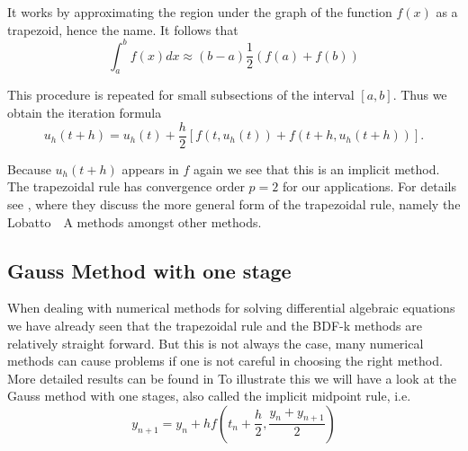 	It works by approximating the region under the graph of the function $f(x)$ as a trapezoid, hence the name. It follows that	
	\begin{displaymath}
		\int_{a}^{b} f(x) dx \approx (b-a)\frac{1}{2} (f(a)+f(b))
	\end{displaymath}
	
	This procedure is repeated for small subsections of the interval $[a,b]$. Thus we obtain the iteration formula
	\begin{displaymath}
		u_h (t+h) = u_h(t) +\frac{h}{2}[f(t,u_h(t)) + f(t+h, u_h(t+h))].
	\end{displaymath}
%	
	
	Because $u_h(t+h)$ appears in $f$ again we see that this is an implicit method. %
	The trapezoidal rule has convergence order $p=2$ for our applications. For details see \cite{HairerErnst1989Tnso}, where they discuss the more general form of the trapezoidal rule, namely the Lobatto~~A methods amongst other methods.
	
	
\subsection{Gauss Method with one stage}

	When dealing with numerical methods for solving differential algebraic equations we have already seen that the trapezoidal rule and the BDF-k methods are relatively straight forward. But this is not always the case, many numerical methods can cause problems if one is not careful in choosing the right method. More detailed results can be found in \cite{HairerErnst1989Tnso}
	To illustrate this we will have a look at the Gauss method with one stages, also called the implicit midpoint rule, i.e.
	\begin{displaymath}
		y_{n+1} = y_n + h f(t_n + \frac{h}{2}, \frac{y_n + y_{n+1}}{2})
	\end{displaymath}

